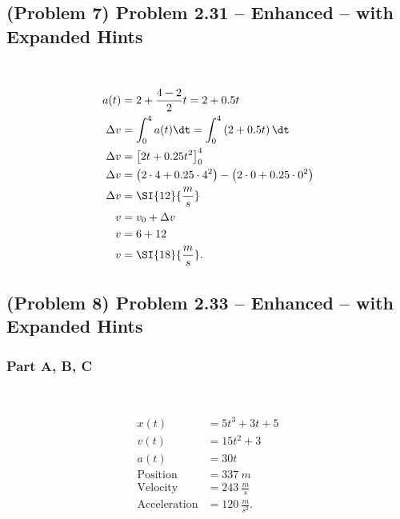 \newpage

\subsection{(Problem 7) Problem 2.31 -- Enhanced -- with Expanded Hints}

~

\begin{solution}
	\begin{align*}
		a(t) &= 2 + \frac{4-2}{2}t = 2+ 0.5t \\
		\Delta v &=  \int_{0}^{4} a(t) \dt = \int_{0}^{4} \left( 2 + 0.5t \right) \dt \\
		\Delta v &= \left[ 2t + 0.25t^2 \right]_{0}^{4} \\
		\Delta v &= \left( 2 \cdot 4 + 0.25 \cdot 4^2 \right) - \left( 2 \cdot 0 + 0.25 \cdot 0^2 \right) \\
		\Delta v &= \SI{12}{\frac{m}{s}} \\
		v &= v_0 + \Delta v \\
		v &= 6 + 12 \\
		v &= \SI{18}{\frac{m}{s}}
		.\end{align*}
\end{solution}

\newpage

\subsection{(Problem 8) Problem 2.33 -- Enhanced -- with Expanded Hints}

\subsubsection{Part A, B, C}

~

\begin{solution}
	\begin{align*}
		x(t) &= 5t^3+3t+5 \\
		v(t) &= 15t^2+3 \\
		a(t) &= 30t \\
		\text{Position} &= \SI{337}{m} \\
		\text{Velocity} &= \SI{243}{\frac{m}{s}} \\
		\text{Acceleration} &= \SI{120}{\frac{m}{s^2}}
		.\end{align*}
\end{solution}

\newpage

